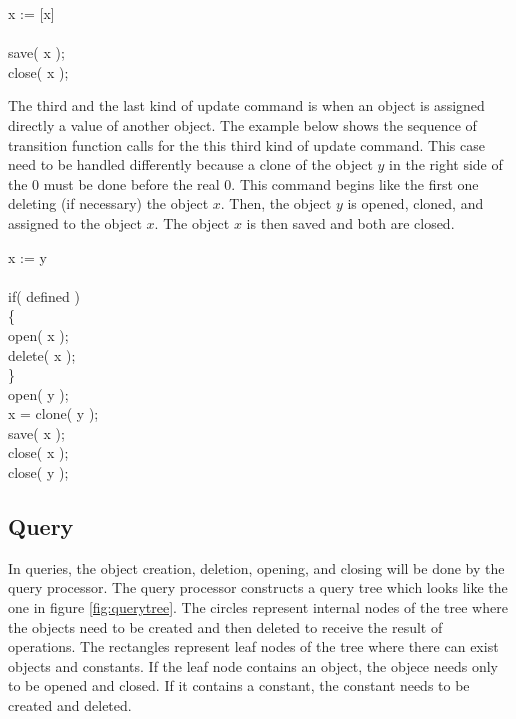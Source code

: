 \documentclass [11pt, a4paper] {article}
\begin{document}
\begin{table}[h]
\begin{pseudocode}
x := [x] \\
\\
save( x ); \\
close( x ); \\
\end{pseudocode}
\end{table}

The third and the last kind of update command is when an object is assigned directly a value of another object. The example below shows the sequence of transition function calls for the this third kind of update command. This case need to be handled differently because a clone of the object $y$ in the right side of the 0 must be done before the real 0. This command begins like the first one deleting (if necessary) the object $x$. Then, the object $y$ is opened, cloned, and assigned to the object $x$. The object $x$ is then saved and both are closed.  

\begin{table}[h]
\begin{pseudocode}
x := y \\
\\
if( defined ) \\
\{ \\
\> open( x ); \\
\> delete( x ); \\
\} \\
open( y );  \\
x = clone( y ); \\
save( x ); \\
close( x ); \\
close( y ); \\
\end{pseudocode}
\end{table}

\subsection{Query}

In queries, the object creation, deletion, opening, and closing will be done by the query processor. The query processor constructs a query tree which looks like the one in figure \ref{fig:querytree}. The circles represent internal nodes of the tree where the objects need to be created and then deleted to receive the result of operations. The rectangles represent leaf nodes of the tree where there can exist objects and constants. If the leaf node contains an object, the objece needs only to be opened and closed. If it contains a constant, the constant needs to be created and deleted. 
\end{document}
